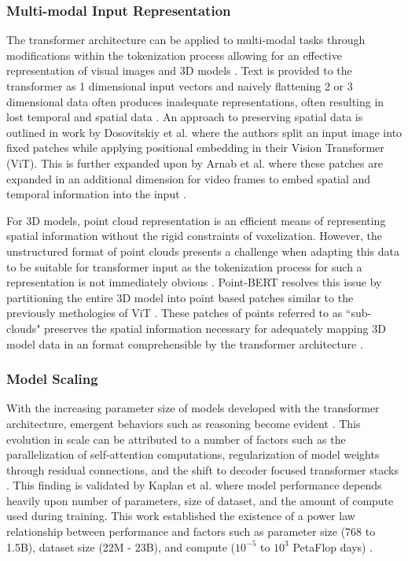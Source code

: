 \subsubsection{Multi-modal Input Representation}
\label{sec:multi-modal}
The transformer architecture can be applied to multi-modal tasks through
modifications within the tokenization process allowing
for an effective representation of visual images \cite{dosovitskiy_image_2020,
arnab_vivit_2021} and 3D models \cite{yu_point-bert_2022}. Text is provided to
the transformer as 1 dimensional input vectors and naively flattening 2 or 3
dimensional data often produces inadequate representations, often resulting in
lost temporal and spatial data \cite{dosovitskiy_image_2020, arnab_vivit_2021}.
An approach to preserving spatial data is outlined in work by Dosovitskiy et al.
\cite{dosovitskiy_image_2020} where the authors split an input image into fixed
patches while applying positional embedding in their Vision Transformer (ViT).
This is further expanded upon by Arnab et al. \cite{arnab_vivit_2021} where
these patches are expanded in an additional dimension for video frames to embed
spatial and temporal information into the input \cite{arnab_vivit_2021}.

For 3D models, point cloud representation is an efficient means of representing
spatial information without the rigid constraints of voxelization. However, the
unstructured format of point clouds presents a challenge when adapting this data
to be suitable for transformer input as the tokenization process for such a
representation is not immediately obvious \cite{yu_point-bert_2022}. Point-BERT
\cite{yu_point-bert_2022} resolves this issue by partitioning the entire 3D
model into point based patches similar to the previously methologies of ViT
\cite{dosovitskiy_image_2020}. These patches of points referred to as
``sub-clouds" preserves the spatial information necessary for adequately mapping
3D model data in an format comprehensible by the transformer architecture
\cite{yu_point-bert_2022}.

\subsubsection{Model Scaling}
\label{sec:transformer-scaling}
With the increasing parameter size of models developed with the transformer
architecture, emergent behaviors such as reasoning become evident
\cite{wei_finetuned_2021, kaplan_scaling_2020, lu_learn_2022}. This evolution in
scale can be attributed to a number of factors such as the parallelization of
self-attention computations, regularization of model weights through residual
connections, and the shift to decoder focused transformer stacks
\cite{radford_improving_2018, vaswani_attention_2023}. This finding is validated
by Kaplan et al. \cite{kaplan_scaling_2020} where model performance depends
heavily upon number of parameters, size of dataset, and the amount of compute
used during training. This work established the existence of a power law
relationship between performance and factors such as parameter size (768 to
1.5B), dataset size (22M - 23B), and compute ($10^{-5}$ to $10^{3}$ PetaFlop
days) \cite{kaplan_scaling_2020}.


